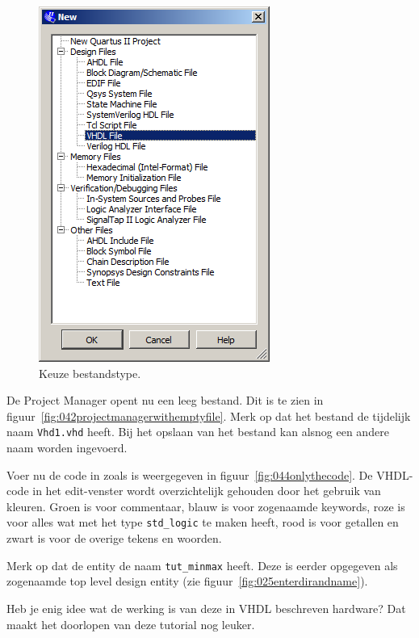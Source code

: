 \documentclass[a4paper,12pt,fleqn,twoside]{book}
\def\tutpicscale{0.455}
\newcommand{\naam}[1]{\texttt{#1}}
\begin{document}
\begin{figure}[H]
\centering
\includegraphics[scale=\tutpicscale]{041newfiledialog.png}
\caption{Keuze bestandstype.}
\label{fig:041newfiledialog}
\end{figure}

De Project Manager opent nu een leeg bestand. Dit is te zien in
figuur~\ref{fig:042projectmanagerwithemptyfile}. Merk op dat het bestand de
tijdelijk naam \naam{Vhd1.vhd} heeft. Bij het opslaan van het bestand kan
alsnog een andere naam worden ingevoerd.

Voer nu de code in zoals is weergegeven in figuur~\ref{fig:044onlythecode}. De
VHDL-code in het edit-venster wordt overzichtelijk gehouden door het gebruik
van kleuren. Groen is voor commentaar, blauw is voor zogenaamde keywords, roze
is voor alles wat met het type \naam{std\_logic} te maken heeft, rood is voor
getallen en zwart is voor de overige tekens en woorden.

Merk op dat de entity de naam \naam{tut\_minmax} heeft. Deze is eerder
opgegeven als zogenaamde top level design entity (zie
figuur~\ref{fig:025enterdirandname}).

Heb je enig idee wat de werking is van deze in VHDL beschreven hardware? Dat
maakt het doorlopen van deze tutorial nog leuker.
\end{document}
